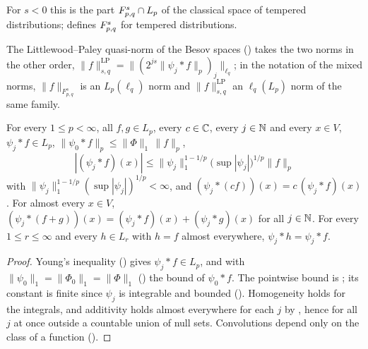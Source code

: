 For $s < 0$ this is the part $F^{s}_{p,q} \cap L_p$ of the classical space of tempered
distributions;  defines $F^{s}_{p,q}$ for tempered
distributions.

The Littlewood--Paley quasi-norm of the Besov spaces () takes the two norms
in the other order, $\|f\|^{\mathrm{LP}}_{s,q} = \|(2^{js} \|\psi_j * f\|_p)_j\|_{\ell_q}$; in the
notation of the mixed norms, $\|f\|_{F^s_{p,q}}$ is an $L_p(\ell_q)$ norm and
$\|f\|^{\mathrm{LP}}_{s,q}$ an $\ell_q(L_p)$ norm of the same family.

\begin{lemma}
\label{lem:tl-pointwise-blocks}
\leanok
{}
For every $1 \leq p < \infty$, all $f, g \in L_p$, every $c \in \mathbb{C}$, every $j \in \mathbb{N}$ and every
$x \in V$, $\psi_j * f \in L_p$, $\|\psi_0 * f\|_p \leq \|\Phi\|_1 \, \|f\|_p$,
\[
  |(\psi_j * f)(x)| \leq \|\psi_j\|_1^{1 - 1/p} \bigl( \sup |\psi_j| \bigr)^{1/p} \|f\|_p
\]
with $\|\psi_j\|_1^{1 - 1/p} ( \sup |\psi_j| )^{1/p} < \infty$, and
$(\psi_j * (c f))(x) = c \, (\psi_j * f)(x)$. For almost every $x \in V$,
$(\psi_j * (f + g))(x) = (\psi_j * f)(x) + (\psi_j * g)(x)$ for all $j \in \mathbb{N}$. For every
$1 \leq r \leq \infty$ and every $h \in L_r$ with $h = f$ almost everywhere,
$\psi_j * h = \psi_j * f$.
\end{lemma}

\begin{proof}
\leanok
Young's inequality () gives $\psi_j * f \in L_p$, and with
$\|\psi_0\|_1 = \|\Phi_0\|_1 = \|\Phi\|_1$ () the bound of
$\psi_0 * f$. The pointwise bound is ; its constant is finite
since $\psi_j$ is integrable and bounded (). Homogeneity holds for
the integrals, and additivity holds almost everywhere for each $j$ by ,
hence for all $j$ at once outside a countable union of null sets. Convolutions depend only on
the class of a function ().
\end{proof}

